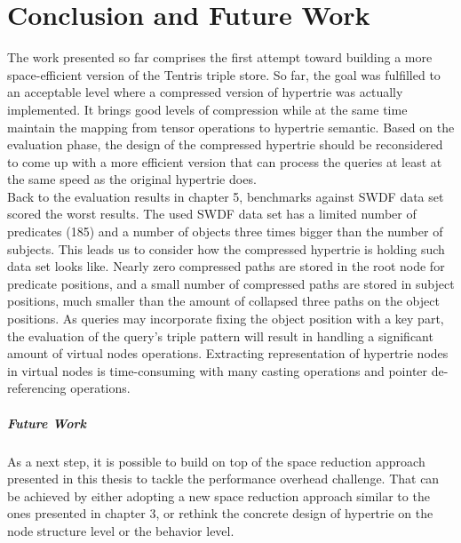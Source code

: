 \chapter{Conclusion and Future Work}
\label{ch:conclusion}

The work presented so far comprises the first attempt toward building a more space-efficient version of the Tentris triple store. So far, the goal was fulfilled to an acceptable level where a compressed version of hypertrie was actually implemented. It brings good levels of compression while at the same time maintain the mapping from tensor operations to hypertrie semantic. Based on the evaluation phase, the design of the compressed hypertrie should be reconsidered to come up with a more efficient version that can process the queries at least at the same speed as the original hypertrie does.\\

Back to the evaluation results in chapter 5, benchmarks against SWDF data set scored the worst results. The used SWDF data set has a limited number of predicates (185) and a number of objects three times bigger than the number of subjects. This leads us to consider how the compressed hypertrie is holding such data set looks like. Nearly zero compressed paths are stored in the root node for predicate positions, and a small number of compressed paths are stored in subject positions, much smaller than the amount of collapsed three paths on the object positions. As queries may incorporate fixing the object position with a key part, the evaluation of the query's triple pattern will result in handling a significant amount of virtual nodes operations. Extracting representation of hypertrie nodes in virtual nodes is time-consuming with many casting operations and pointer de-referencing operations.

\paragraph{Future Work}
As a next step, it is possible to build on top of the space reduction approach presented in this thesis to tackle the performance overhead challenge. That can be achieved by either adopting a new space reduction approach similar to the ones presented in chapter 3, or rethink the concrete design of hypertrie on the node structure level or the behavior level.